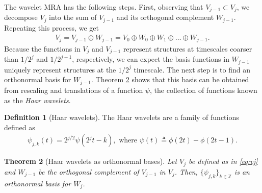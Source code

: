 \documentclass{article}
\def\defeq{\triangleq}
\theoremstyle{plain}
\newtheorem{theorem}{Theorem}[section]
\theoremstyle{definition}
\newtheorem{definition}[theorem]{Definition}
\theoremstyle{remark}
\begin{document}
The wavelet MRA has the following steps. 
First, observing that $V_{j-1} \subset V_j$, we decompose $V_j$ into the sum of $V_{j-1}$ and its orthogonal complement $W_{j-1}$. 
Repeating this process, we get  
\begin{align} \label{eq:vj-decomp}
    V_j = V_{j-1} \oplus	 W_{j - 1} = V_0 \oplus W_0 \oplus W_1 \oplus \dots \oplus W_{j-1}.  
\end{align}
Because the functions in $V_j$ and $V_{j-1}$ represent structures at timescales coarser than $1/2^j$ and $1/2^{j-1}$, respectively, 
we can expect the basis functions in $W_{j-1}$ uniquely represent structures at the $1/2^j$ timescale. 
The next step is to find an orthonormal basis for $W_{j-1}$. 
Theorem \ref{thm:wavelet} shows that this basis 
can be obtained from rescaling and translations of a function $\psi$, the collection of functions known as the \emph{Haar wavelets}. 

\begin{definition}[Haar wavelets] \label{def:haar-wavelets}
    The Haar wavelets are a family of functions defined as
    \begin{align}
        \psi_{j,k}(t) 
        =  2^{j/2}\psi(2^jt - k), \text{ where }\psi(t) \defeq \phi(2t) - \phi(2t - 1).
    \end{align}
\end{definition}

\begin{theorem}[Haar wavelets as orthonormal bases] \label{thm:wavelet}
    Let $V_j$ be defined as in \eqref{eq:vj} and $W_{j-1}$ be the orthogonal complement of $V_{j-1}$ in $V_j$. 
    Then, $\{\psi_{j,k}\}_{k\in \mathbb{Z}}$ is an orthonormal basis for $W_j$. 
\end{theorem}
\end{document}
